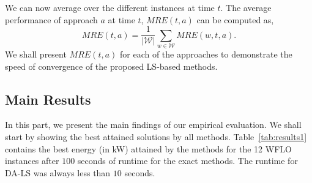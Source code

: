 \documentclass[preprint,12pt]{elsarticle}
\begin{document}
We can now average over the different instances at time $t$. The average performance of approach $a$ at time $t$, $MRE(t,a)$ can be computed as, \begin{equation} MRE(t,a) = \frac{1}{|\mathcal{W}|}\sum_{ w\in\mathcal{W}} MRE(w,t,a).\end{equation}
We shall present $MRE(t,a)$ for each of the approaches to demonstrate the speed of convergence of the proposed LS-based methods.


\subsection{Main Results}

In this part, we present the main findings of our empirical evaluation. 
We shall start by showing the best attained solutions by all methods.
Table~\ref{tab:results1} contains the best energy (in kW) attained by the methods
for the 12 WFLO instances after $100$ seconds of runtime for the exact methods. 
The runtime for DA-LS was always less than $10$ seconds.
\end{document}
